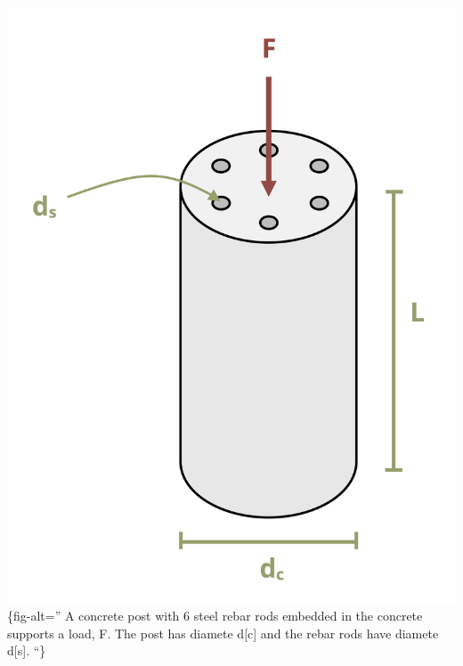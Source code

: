 \documentclass[
  letterpaper,
  DIV=11,
  numbers=noendperiod]{scrreprt}
\begin{document}
\includegraphics{images/250.png}\{fig-alt='' A concrete post with 6
steel rebar rods embedded in the concrete supports a load, F. The post
has diamete d{[}c{]} and the rebar rods have diamete d{[}s{]}. ``\}
\end{document}
